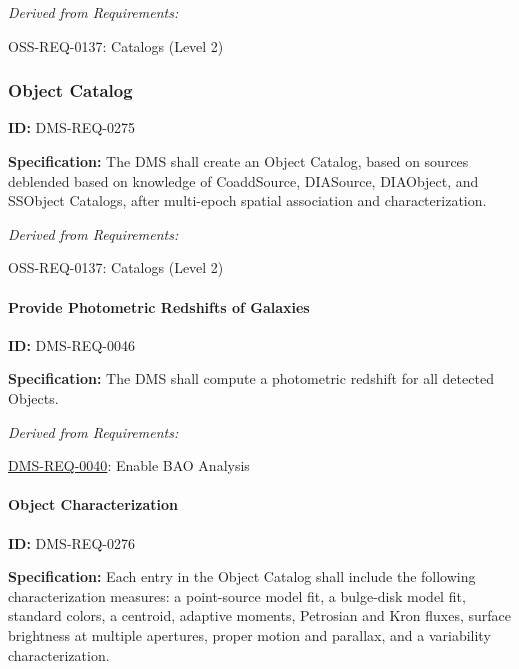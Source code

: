 \documentclass[SE,toc,lsstdraft]{lsstdoc}
\begin{document}
\emph{Derived from Requirements:}

OSS-REQ-0137:
Catalogs (Level 2) \newline


\subsubsection{Object Catalog}

\label{DMS-REQ-0275}
\textbf{ID:} DMS-REQ-0275

\textbf{Specification:} The DMS shall create an Object Catalog, based on sources deblended based on knowledge of CoaddSource, DIASource, DIAObject, and SSObject Catalogs, after multi-epoch spatial association and characterization.






\emph{Derived from Requirements:}

OSS-REQ-0137:
Catalogs (Level 2) \newline


\paragraph{Provide Photometric Redshifts of Galaxies}\hfill  %

\label{DMS-REQ-0046}
\textbf{ID:} DMS-REQ-0046

\textbf{Specification:} The DMS shall compute a photometric redshift for all detected Objects.






\emph{Derived from Requirements:}

\hyperref[DMS-REQ-0040]{DMS-REQ-0040}:
Enable BAO Analysis \newline


\paragraph{Object Characterization}\hfill  %

\label{DMS-REQ-0276}
\textbf{ID:} DMS-REQ-0276

\textbf{Specification:} Each entry in the Object Catalog shall include the following characterization measures: a point-source model fit, a bulge-disk model fit, standard colors, a centroid, adaptive moments, Petrosian and Kron fluxes, surface brightness at multiple apertures, proper motion and parallax, and a variability characterization.
\end{document}
